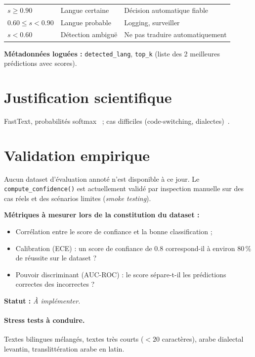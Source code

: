 \begin{center}
\begin{tabular}{lll}
\toprule
$s \geq 0.90$ & Langue certaine & Décision automatique fiable \\
$0.60 \leq s < 0.90$ & Langue probable & Logging, surveiller \\
$s < 0.60$ & Détection ambiguë & Ne pas traduire automatiquement \\
\bottomrule
\end{tabular}
\end{center}

\textbf{Métadonnées loguées :} \texttt{detected\_lang},
\texttt{top\_k} (liste des 2 meilleures prédictions avec scores).

\section{Justification scientifique}

FastText, probabilités softmax~\cite{joulin2017bag} ;
cas difficiles (code-switching, dialectes)~\cite{caswell2020language}.

\section{Validation empirique}

Aucun dataset d'évaluation annoté n'est disponible à ce jour. Le
\texttt{compute\_confidence()} est actuellement validé par inspection manuelle
sur des cas réels et des scénarios limites (\textit{smoke testing}).

\noindent\textbf{Métriques à mesurer lors de la constitution du dataset :}
\begin{itemize}
  \item Corrélation entre le score de confiance et la bonne classification ;
  \item Calibration (ECE) : un score de confiance de 0.8 correspond-il à
    environ 80\,\% de réussite sur le dataset ?
  \item Pouvoir discriminant (AUC-ROC) : le score sépare-t-il les prédictions
    correctes des incorrectes ?
\end{itemize}

\noindent\textbf{Statut :} \textit{À implémenter.}

\paragraph{Stress tests à conduire.}
Textes bilingues mélangés, textes très courts ($< 20$ caractères), arabe
dialectal levantin, translittération arabe en latin.
